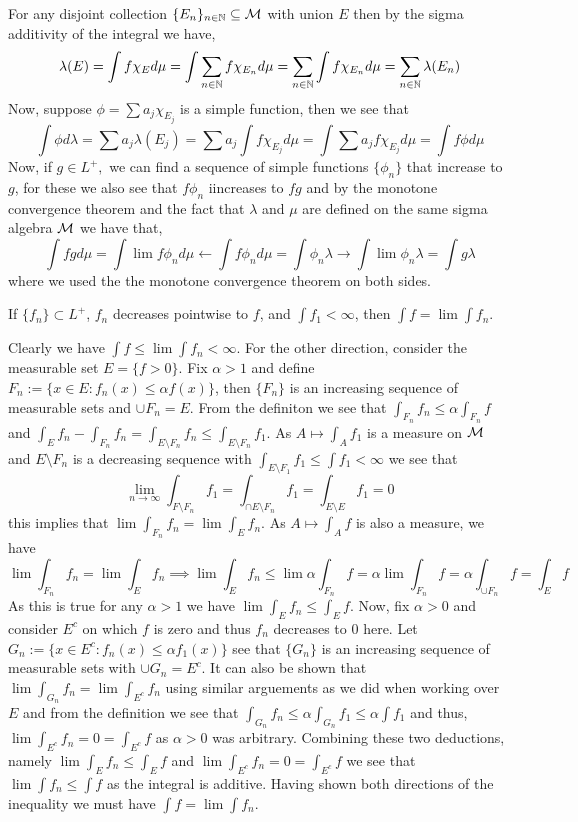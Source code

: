 \documentclass[12pt,a4paper]{article}
\begin{document}
\begin{solution}
    For any disjoint collection $\{E_n\}_{n\in\mathbb{N}}\subseteq\mathcal{M}$ with union $E$ then by the sigma additivity of the integral we have, 
    $$\lambda(E)=\int f\chi_Ed\mu=\int\sum_{n\in\mathbb{N}}f\chi_{E_n}d\mu=\sum_{n\in\mathbb{N}}\int f\chi_{E_n}d\mu=\sum_{n\in\mathbb{N}}\lambda(E_n)$$ 
    Now, suppose $\phi=\sum a_j\chi_{E_j}$ is a simple function, then we see that 
    $$\int\phi d\lambda=\sum a_j\lambda(E_j)=\sum a_j\int f\chi_{E_j}d\mu=\int\sum a_jf\chi_{E_j}d\mu=\int f\phi d\mu$$ 
    Now, if $g\in L^+,$ we can find a sequence of simple functions $\{\phi_n\}$ that increase to $g$, for these we also see that $f\phi_n$ iincreases to $fg$ and by the monotone convergence theorem and the fact that $\lambda$ and $\mu$ are defined on the same sigma algebra $\mathcal{M}$ we have that, 
    $$\int fg d\mu=\int\lim f\phi_n d\mu\longleftarrow\int f\phi_n d\mu=\int\phi_n\lambda\longrightarrow \int\lim\phi_n\lambda=\int g\lambda$$ 
    where we used the the monotone convergence theorem on both sides.
\end{solution}
\begin{problem}\label{prob:2-15}
If $\{f_n\} \subset L^+$, $f_n$ decreases pointwise to $f$, and $\int f_1 < \infty$, then $\int f = \lim \int f_n$.
\end{problem}
\begin{solution}
    Clearly we have $\int f\leq\lim\int f_n<\infty$. 
    For the other direction, consider the measurable set $E=\{f>0\}$. 
    Fix $\alpha>1$ and define $F_n:=\{x\in E:f_n(x)\leq\alpha f(x)\}$, then $\{F_n\}$ is an increasing sequence of measurable sets and $\cup F_n=E$. 
    From the definiton we see that $\int_{F_n}f_n\leq\alpha\int_{F_n}f$ and $\int_E f_n-\int_{F_n}f_n=\int_{E\setminus F_n}f_n\leq\int_{E\setminus F_n}f_1$. 
    As $A\mapsto\int_A f_1$ is a measure on $\mathcal{M}$ and $E\setminus F_n$ is a decreasing sequence with $\int_{E\setminus F_1}f_1\leq\int f_1<\infty$ we see that 
    $$\lim_{n\to\infty}\int_{F\setminus F_n}f_1=\int_{\cap E\setminus F_n}f_1=\int_{E\setminus E}f_1=0$$
    this implies that $\lim\int_{F_n}f_n=\lim\int_E f_n$. 
    As $A\mapsto\int_Af$ is also a measure, we have 
    $$\lim\int_{F_n}f_n=\lim\int_E f_n\implies\lim\int_Ef_n\leq\lim\alpha\int_{F_n} f=\alpha\lim\int_{F_n}f=\alpha\int_{\cup F_n}f=\int_Ef$$ 
    As this is true for any $\alpha>1$ we have $\lim\int_Ef_n\leq\int_Ef$. 
    Now, fix $\alpha>0$ and consider $E^c$ on which $f$ is zero and thus $f_n$ decreases to $0$ here. 
    Let $G_n:=\{x\in E^c:f_n(x)\leq \alpha f_1(x)\}$ see that $\{G_n\}$ is an increasing sequence of measurable sets with $\cup G_n=E^c$. 
    It can also be shown that $\lim\int_{G_n}f_n=\lim\int_{E^c}f_n$ using similar arguements as we did when working over $E$ and from the definition we see that $\int_{G_n}f_n\leq\alpha\int_{G_n}f_1\leq\alpha\int f_1$ and thus, $\lim\int_{E^c}f_n=0=\int_{E^c}f$ as $\alpha>0$ was arbitrary. 
    Combining these two deductions, namely $\lim\int_Ef_n\leq\int_Ef$ and $\lim\int_{E^c}f_n=0=\int_{E^c}f$ we see that $\lim\int f_n\leq\int f$ as the integral is additive. 
    Having shown both directions of the inequality we must have $\int f=\lim\int f_n$. 
    
\end{solution}
\end{document}
